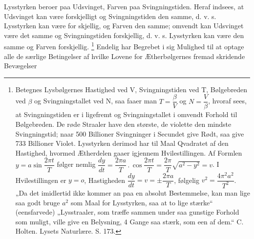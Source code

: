 \documentclass[12pt,a4paper]{book}
\renewcommand{\thefootnote}{*)}
\begin{document}
\renewcommand{\thefootnote}{*)}
Lysstyrken beroer paa Udsvinget, Farven paa Svingningstiden. Heraf
indsees, at Udsvinget kan være forskjelligt og Svingningstiden den
samme, d. v. s. Lysstyrken kan være for\-%
skjellig, og Farven den samme; omvendt kan Udsvinget være det samme og
Svingningstiden forskjellig, d. v. s. Lysstyrken kan være den samme og
Farven forskjellig.%
\footnote{%
Betegnes Lysbølgernes Hastighed ved V, Svingningstiden ved T,
Bølgebreden ved $\beta$ og Svingningstallet ved N, saa faaer man
$T = \dfrac{\beta}{V}$ og $N = \dfrac{V}{\beta}$, hvoraf sees, at
Svingningstiden er i ligefremt og Svingningstallet i omvendt Forhold
til Bølgebreden. De røde Straaler have den største, de violette den
mindste Svingningstid; naar 500 Billioner Svingninger i Secundet give
Rødt, saa give 733 Billioner Violet. Lysstyrken derimod har til Maal
Qvadratet af den Hastighed, hvormed Ætherdelen gaaer igjennem
Hvilestillingen. Af Formlen $y = a\sin\dfrac{2\pi t}{T}$ følger nemlig
$\dfrac{dy}{dt} = \dfrac{2\pi a}{T}\,.\,\cos\dfrac{2\pi t}{T}
 = \dfrac{2\pi}{T}\sqrt{a^{2}-y^{2}} = v$. I Hvilestillingen er
$y = o$, Hastigheden $\dfrac{dy}{dt} = v = \pm\dfrac{2\pi a}{T}$,
følgelig $v^{2} = \dfrac{4\pi^{2}a^{2}}{T^{2}}$. „Da det imidlertid
ikke kommer an paa en absolut Bestemmelse, kan man lige saa godt bruge
$a^{2}$ som Maal for Lysstyrken, saa at to lige stærke“ (eensfarvede)
„Lysstraaler, som træffe sammen under saa gunstige Forhold som muligt,
ville give en Belysning, 4 Gange saa stærk, som een af dem.“
C. Holten. Lysets Naturlære. S. 173.}
Endelig har
Begrebet i sig Mulighed til at optage alle de særlige Betingelser af
hvilke Lovene for Ætherbølgernes fremad\-%
skridende Bevægelser%
\end{document}
